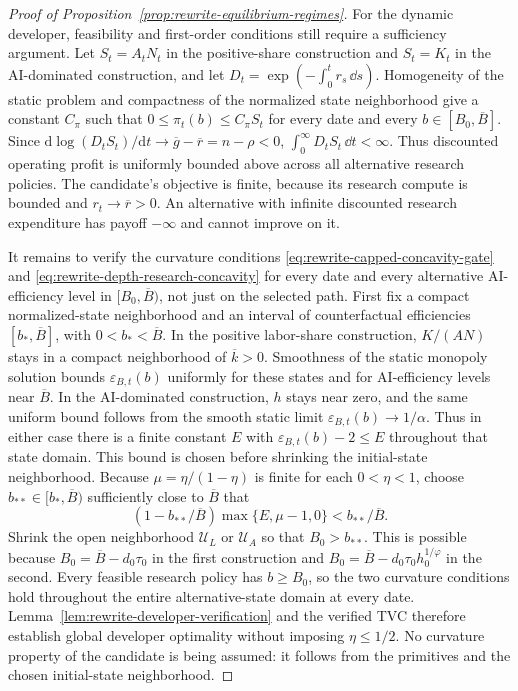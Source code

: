 \begin{proof}[Proof of Proposition~\ref{prop:rewrite-equilibrium-regimes}]
For the dynamic developer, feasibility and first-order conditions still
require a sufficiency argument. Let $S_t= A_tN_t$ in the positive-share
construction and $S_t=K_t$ in the AI-dominated construction, and let
$D_t=\exp(-\int_0^t r_s\,\dd s)$. Homogeneity of the static problem and
compactness of the normalized state neighborhood give a constant $C_\pi$
such that $0\leq\pi_t(b)\leq C_\pi S_t$ for every date and every
$b\in[B_0,\overline B]$. Since
$\mathrm d\log(D_tS_t)/\mathrm dt\to\overline g-\overline r=n-\rho<0$,
$\int_0^\infty D_tS_t\,\dd t<\infty$. Thus discounted operating profit
is uniformly bounded above across all alternative research policies.
The candidate's objective is finite, because its research compute is
bounded and $r_t\to\overline r>0$. An alternative with infinite discounted
research expenditure has payoff $-\infty$ and cannot improve on it.

It remains to verify the curvature conditions
\eqref{eq:rewrite-capped-concavity-gate} and
\eqref{eq:rewrite-depth-research-concavity} for every date and every alternative
AI-efficiency level in $[B_0,\overline B)$, not just on the selected path.
First fix a compact normalized-state neighborhood and an interval of
counterfactual efficiencies $[b_*,\overline B]$, with $0<b_*<\overline B$.
In the positive labor-share construction, $K/(AN)$ stays in a compact
neighborhood of $\overline k>0$. Smoothness of the static monopoly solution
bounds $\varepsilon_{B,t}(b)$ uniformly for these states and for AI-efficiency levels near
$\overline B$. In the AI-dominated construction, $h$ stays near zero, and
the same uniform bound follows from the smooth static limit
$\varepsilon_{B,t}(b)\to1/\alpha$. Thus in either case there is a finite constant
$E$ with $\varepsilon_{B,t}(b)-2\leq E$ throughout that state domain.
This bound is chosen before shrinking the initial-state neighborhood.
Because $\mu=\eta/(1-\eta)$ is finite for each $0<\eta<1$, choose
$b_{**}\in[b_*,\overline B)$ sufficiently close to $\overline B$ that
\[
 (1-b_{**}/\overline B)\max\{E,\mu-1,0\}<b_{**}/\overline B.
\]
Shrink the open neighborhood $\mathcal U_L$ or $\mathcal U_A$ so that
$B_0>b_{**}$.
This is possible because $B_0=\overline B-d_0\tau_0$ in the first
construction and $B_0=\overline B-d_0\tau_0h_0^{1/\varphi}$ in the second.
Every feasible research policy has $b\geq B_0$, so the two curvature
conditions hold throughout the entire alternative-state domain at every
date. Lemma~\ref{lem:rewrite-developer-verification} and the verified TVC
therefore establish global developer optimality without imposing
$\eta\leq1/2$. No curvature property of
the candidate is being assumed: it follows from the primitives and the
chosen initial-state neighborhood.


\end{proof}
